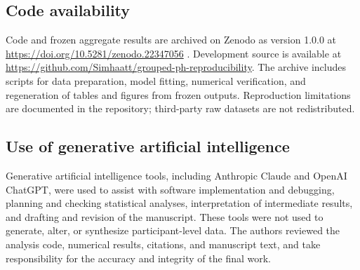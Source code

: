 \documentclass[smallextended,natbib]{svjour3}
\begin{document}
\subsection*{Code availability}

Code and frozen aggregate results are archived on Zenodo as version 1.0.0 at \url{https://doi.org/10.5281/zenodo.22347056} \citep{simhaa2026groupedcode}. Development source is available at \url{https://github.com/Simhaatt/grouped-ph-reproducibility}. The archive includes scripts for data preparation, model fitting, numerical verification, and regeneration of tables and figures from frozen outputs. Reproduction limitations are documented in the repository; third-party raw datasets are not redistributed.

\subsection*{Use of generative artificial intelligence}

Generative artificial intelligence tools, including Anthropic Claude and OpenAI ChatGPT, were used to assist with software implementation and debugging, planning and checking statistical analyses, interpretation of intermediate results, and drafting and revision of the manuscript. These tools were not used to generate, alter, or synthesize participant-level data. The authors reviewed the analysis code, numerical results, citations, and manuscript text, and take responsibility for the accuracy and integrity of the final work.



\end{document}
